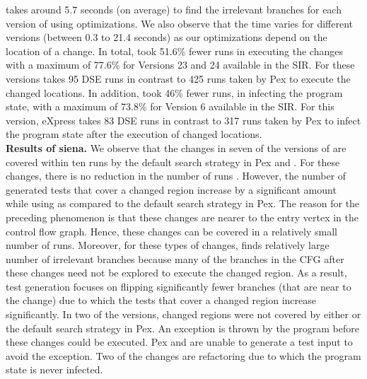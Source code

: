  takes around 5.7 seconds (on average) to find the irrelevant branches for each version of  using optimizations. We also observe that the time varies for different versions (between 0.3 to 21.4 seconds) as our optimizations depend on the location of a change. In total,  took 51.6\% fewer runs in executing the changes with a maximum of 77.6\% for Versions 23 and 24 available in the SIR. For these versions  takes 95 DSE runs in contrast to 425 runs taken by Pex to execute the changed locations.  In addition,  took 46\% fewer runs, in infecting the program state, with a maximum of 73.8\% for Version 6 available in the SIR. For this version, eXpress takes 83 DSE runs in contrast to 317 runs taken by Pex to infect the program state after the execution of changed locations.  
\\ \textbf{Results of siena. }We observe that the changes in seven of the versions of  are covered within ten runs by the default search strategy in Pex and . For these changes, there is no reduction in the number of runs . However, the number of generated tests that cover a changed region increase by a significant amount while using  as compared to the default search strategy in Pex. The reason for the preceding phenomenon is that these changes are nearer  to the entry vertex in the control flow graph. Hence, these changes can be covered in a relatively small number of runs. Moreover, for these types of changes,  finds relatively large number of irrelevant branches because many of the branches in the CFG after these changes need not be explored to execute the changed region. As a result, test generation focuses on flipping significantly fewer branches (that are near to the change) due to which the tests that cover a changed region increase significantly. In two of the versions, changed regions were not covered by either  or the default search strategy in Pex. An exception is thrown by the program before these changes could be executed. Pex and  are unable to generate a test input to avoid the exception. Two of the changes are refactoring due to which the program state is never infected.
